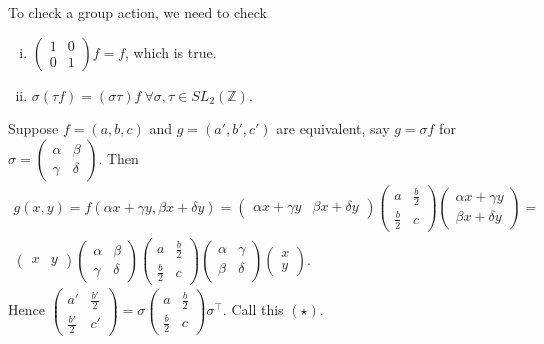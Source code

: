 \documentclass{article}
\theoremstyle{definition}
\begin{document}
To check a group action, we need to check 
\begin{enumerate}[(i)]
    \item $\begin{pmatrix} 1 & 0\\0&1 \end{pmatrix} f = f$, which is true.
    \item $\sigma(\tau f) = (\sigma \tau)f ~\forall \sigma, \tau \in SL_2(\mathbb{Z})$.
\end{enumerate}
Suppose $f=(a,b,c)$ and $g=(a',b',c')$ are equivalent, say $g = \sigma f$ for $\sigma = \begin{pmatrix}  \alpha & \beta\\ \gamma &\delta \end{pmatrix}$. Then 
\begin{align*}
    g(x,y)=f(\alpha x + \gamma y, \beta x + \delta y) = \begin{pmatrix} \alpha x + \gamma y & \beta x + \delta y \end{pmatrix} \begin{pmatrix} a & \frac{b}{2} \\ \frac{b}{2} & c \end{pmatrix} \begin{pmatrix} \alpha x  + \gamma y \\ \beta x + \delta y \end{pmatrix} = \\
    \begin{pmatrix} x & y \end{pmatrix}\begin{pmatrix} \alpha & \beta \\ \gamma & \delta \end{pmatrix}\begin{pmatrix}  a & \frac{b}{2} \\ \frac{b}{2} & c \end{pmatrix}\begin{pmatrix} \alpha & \gamma \\ \beta & \delta \end{pmatrix}\begin{pmatrix} x \\ y \end{pmatrix}.
\end{align*}
Hence $\begin{pmatrix} a' & \frac{b'}{2} \\ \frac{b'}{2} & c' \end{pmatrix} = \sigma \begin{pmatrix} a & \frac{b}{2} \\ \frac{b}{2} & c \end{pmatrix} \sigma^\top$. Call this $(\star)$.
\end{document}
